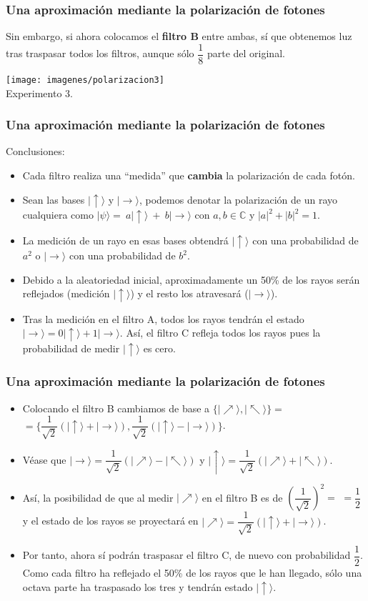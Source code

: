 \documentclass{beamer}
\newcommand{\base}[1]{|#1\rangle}
\newcommand{\baseup}{\mid\uparrow\rangle}
\newcommand{\baseright}{\mid\rightarrow\rangle}
\newcommand{\baseupright}{\mid\nearrow\rangle}
\newcommand{\baseupleft}{\mid\nwarrow\rangle}
\newcommand{\complex}{\mathbb{C}}
\begin{document}
\begin{frame}
	\frametitle{Una aproximación mediante la polarización de fotones}
	Sin embargo, si ahora colocamos el \textbf{filtro B} entre ambas, sí que obtenemos luz 		tras traspasar todos los filtros, aunque sólo $\dfrac{1}{8}$ parte del original.
	\begin{center}
	\texttt{[image: imagenes/polarizacion3]}\\
	Experimento 3.
	\end{center}
\end{frame}

\begin{frame}
	\frametitle{Una aproximación mediante la polarización de fotones}
	Conclusiones:
	\begin{itemize}
	\item Cada filtro realiza una ``medida'' que \textbf{cambia} la polarización de cada fotón. 
	\item Sean las bases $\baseup$ y $\baseright$, podemos denotar la polarización de un rayo cualquiera como $\base\psi =\ a\baseup\ +\ b\baseright$ con $a,b \in\complex$ y $|a|^2+|b|^2=1.$
	\item La medición de un rayo en esas bases obtendrá $\baseup$ con una probabilidad de $a^2$ o $\baseright$ con una probabilidad de $b^2$.
	\item Debido a la aleatoriedad inicial, aproximadamente un 50\% de los rayos serán reflejados (medición $\baseup$) y el resto los atravesará ($\baseright$).
	\item Tras la medición en el filtro A, todos los rayos tendrán el estado $\baseright = 0\baseup + 1\baseright$. Así, el filtro C refleja todos los rayos pues la probabilidad de medir $\baseup$ es cero.
	\end{itemize}
\end{frame}

\begin{frame}
	\frametitle{Una aproximación mediante la polarización de fotones}
	\begin{itemize}
	\item Colocando el filtro B cambiamos de base a $\{\baseupright, \baseupleft\}=$ $=\{\dfrac{1}{\sqrt{2}}(\baseup + \baseright), \dfrac{1}{\sqrt{2}}(\baseup - \baseright)\}$.
	\item Véase que $\baseright = \dfrac{1}{\sqrt{2}}(\baseupright - \baseupleft)$ y $\baseup = \dfrac{1}{\sqrt{2}}(\baseupright + \baseupleft)$.
	\item Así, la posibilidad de que al medir $\baseupright$ en el filtro B es de $\left(\dfrac{1}{\sqrt{2}}\right)^2=$ $=\dfrac{1}{2}$ y el estado de los rayos se proyectará en $\baseupright=\dfrac{1}{\sqrt{2}}(\baseup + \baseright)$.
	\item Por tanto, ahora sí podrán traspasar el filtro C, de nuevo con probabilidad $\dfrac{1}{2}$. Como cada filtro ha reflejado el 50\% de los rayos que le han llegado, sólo una octava parte ha traspasado los tres y tendrán estado $\baseup$.
	\end{itemize}
\end{frame}
\end{document}
